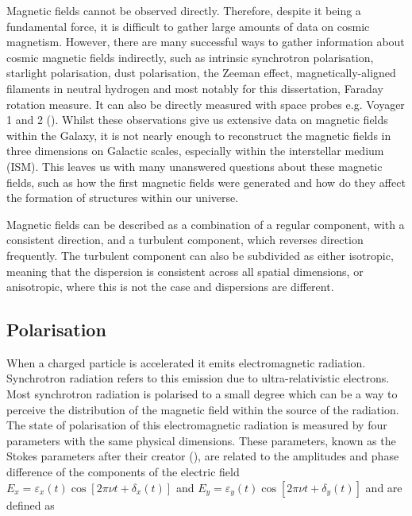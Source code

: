 Magnetic fields cannot be observed directly. Therefore, despite it being a fundamental force, it is difficult to gather large amounts of data on cosmic magnetism. However, there are many successful ways to gather information about cosmic magnetic fields indirectly, such as intrinsic synchrotron polarisation, starlight polarisation, dust polarisation, the Zeeman effect, magnetically-aligned filaments in neutral hydrogen and most notably for this dissertation, Faraday rotation measure. It can also be directly measured with space probes e.g. Voyager 1 and 2 (\cite{voyager}). Whilst these observations give us extensive data on magnetic fields within the Galaxy, it is not nearly enough to reconstruct the magnetic fields in three dimensions on Galactic scales, especially within the interstellar medium (ISM). This leaves us with many unanswered questions about these magnetic fields, such as how the first magnetic fields were generated and how do they affect the formation of structures within our universe. 

Magnetic fields can be described as a combination of a regular component, with a consistent direction, and a turbulent component, which reverses direction frequently. The turbulent component can also be subdivided as either isotropic, meaning that the dispersion is consistent across all spatial dimensions, or anisotropic, where this is not the case and dispersions are different. 


\subsection{Polarisation}

When a charged particle is accelerated it emits electromagnetic radiation. Synchrotron radiation refers to this emission due to ultra-relativistic electrons. Most synchrotron radiation is polarised to a small degree which can be a way to perceive the distribution of the magnetic field within the source of the radiation. The state of polarisation of this electromagnetic radiation is measured by four parameters with the same physical dimensions. These parameters, known as the Stokes parameters after their creator (\cite{Stokes}), are related to the amplitudes and phase difference of the components of the electric field $E_x = \varepsilon_x(t)\cos [2\pi\nu t+\delta_x(t)]$ and $E_y = \varepsilon_y(t)\cos [2\pi\nu t+\delta_y(t)]$ and are defined as 

